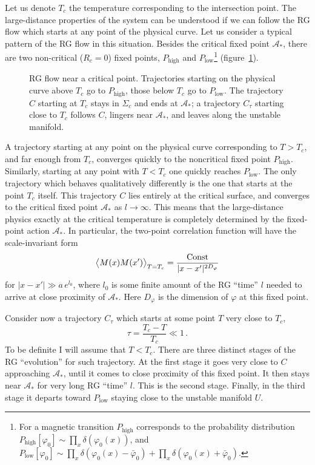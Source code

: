Let us denote $T_c$ the temperature corresponding to the intersection point. The
large-distance properties of the system can be understood if we can follow the RG
flow which starts at any point of the physical curve. Let us consider a typical
pattern of the RG flow in this situation. Besides the critical fixed point
$\mathcal A_*$, there are two non-critical ($R_c=0$) fixed points,
$P_{\text{high}}$ and $P_{\text{low}}$\footnote{For a magnetic transition
$P_{\text{high}}$ corresponds to the probability distribution
$P_{\text{high}}[\varphi_0]\sim\prod_x\delta(\varphi_0(x))$, and
$P_{\text{low}}[\varphi_0]\sim\prod_x\delta(\varphi_0(x)-\bar\varphi_0)+\prod_x\delta(\varphi_0(x)+\bar\varphi_0)$.}
(figure~\ref{fig:critflow}).
\begin{figure}[ht]
\centering{}
\caption{RG flow near a critical point. Trajectories starting on the physical
curve above $T_c$ go to $P_{\text{high}}$, those below $T_c$ go to
$P_{\text{low}}$. The trajectory $C$ starting at $T_c$ stays in $\Sigma_c$ and
ends at $\mathcal A_*$; a trajectory $C_\tau$ starting close to $T_c$ follows $C$,
lingers near $\mathcal A_*$, and leaves along the unstable manifold.}
\label{fig:critflow}
\end{figure}

A trajectory starting at any point on the physical curve corresponding to $T>T_c$,
and far enough from $T_c$, converges quickly to the noncritical fixed point
$P_{\text{high}}$. Similarly, starting at any point with $T<T_c$ one quickly
reaches $P_{\text{low}}$. The only trajectory which behaves qualitatively
differently is the one that starts at the point $T_c$ itself. This trajectory $C$
lies entirely at the critical surface, and converges to the critical fixed point
$\mathcal A_*$ as $l\to\infty$. This means that the large-distance physics exactly
at the critical temperature is completely determined by the fixed-point action
$\mathcal A_*$. In particular, the two-point correlation function will have the
scale-invariant form
\[
\bigl\langle M(x)M(x')\bigr\rangle_{T=T_c}=\frac{\text{Const}}{|x-x'|^{2D_\varphi}}
\]
for $|x-x'|\gg a\,e^{l_0}$, where $l_0$ is some finite amount of the RG ``time''
$l$ needed to arrive at close proximity of $\mathcal A_*$. Here $D_\varphi$ is the
dimension of $\varphi$ at this fixed point.

Consider now a trajectory $C_\tau$ which starts at some point $T$ very close to
$T_c$,
\begin{equation}\label{eq:tau}
\tau=\frac{T_c-T}{T_c}\ll1\,.
\end{equation}
To be definite I will assume that $T<T_c$. There are three distinct stages of the
RG ``evolution'' for such trajectory. At the first stage it goes very close to $C$
approaching $\mathcal A_*$, until it comes to close proximity of this fixed point.
It then stays near $\mathcal A_*$ for very long RG ``time'' $l$. This is the
second stage. Finally, in the third stage it departs toward $P_{\text{low}}$
staying close to the unstable manifold $U$.


